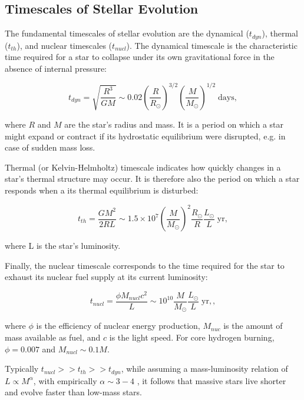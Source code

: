 \subsection{Timescales of Stellar Evolution}

The fundamental timescales of stellar evolution are the dynamical ($t_{dyn}$), thermal ($t_{th}$), and nuclear timescales ($t_{nucl}$). The dynamical timescale is the characteristic time required for a star to collapse under its own gravitational force in the absence of internal pressure:

\begin{equation}
    t_{dyn} = \sqrt{\frac{R^3}{GM}} \sim 0.02 \left( \frac{R}{R_{\odot}} \right)^{3/2} \left( \frac{M}{M_{\odot}}\right)^{1/2} \; \text{days},
\end{equation}\label{eq:dynamical_timsecale}

where $R$ and $M$ are the star's radius and mass. It is a period on which a star might expand or contract if its hydrostatic equilibrium were disrupted, e.g. in case of sudden mass loss.

Thermal (or Kelvin-Helmholtz) timescale indicates how quickly changes in a star's thermal structure may occur. It is therefore also the period on which a star responds when a its thermal equilibrium is disturbed:

\begin{equation}
    t_{th} = \frac{G M^2}{2RL} \sim 1.5 \times 10^7 \left( \frac{M}{M_{\odot}} \right)^{2} \frac{R_{\odot}}{R} \frac{L_{\odot}}{L} \; \text{yr},
\end{equation}\label{eq:thermal_timsecale}

where L is the star's luminosity.

Finally, the nuclear timescale corresponds to the time required for the star to exhaust its nuclear fuel supply at its current luminosity: 

\begin{equation}
    t_{nucl} = \frac{\phi M_{nucl} c^2}{L} \sim 10^{10} \frac{M}{M_{\odot}} \frac{L_{\odot}}{L} \; \text{yr},,
\end{equation}\label{eq:nuclear_timsecale}

where $\phi$ is the efficiency of nuclear energy production, $M_{nuc}$ is the amount of mass available as fuel, and $c$ is the light speed. For core hydrogen burning, $\phi = 0.007$ and $M_{nucl} \sim 0.1 M$.

Typically $t_{nucl} >> t_{th} >> t_{dyn}$, while assuming a mass-luminosity relation of $L \propto M^{\alpha}$, with empirically $\alpha \sim 3-4$ \citep{eker2015main}, it follows that massive stars live shorter and evolve faster than low-mass stars.

